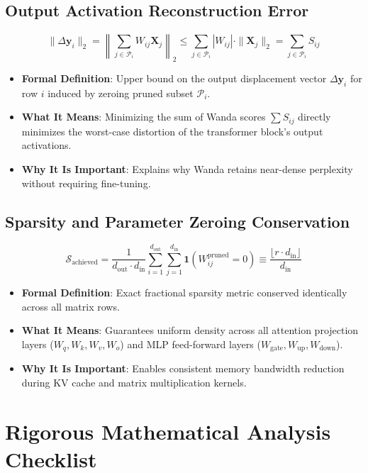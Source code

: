 \documentclass[11pt,a4paper]{article}
\theoremstyle{definition}
\begin{document}
\subsection{Output Activation Reconstruction Error}
{\boldmath
\begin{equation}
\|\Delta \mathbf{y}_i\|_2 = \left\| \sum_{j \in \mathcal{P}_i} W_{ij} \mathbf{X}_j \right\|_2 \le \sum_{j \in \mathcal{P}_i} |W_{ij}| \cdot \|\mathbf{X}_j\|_2 = \sum_{j \in \mathcal{P}_i} S_{ij}
\end{equation}
}
\begin{itemize}
    \item \textbf{Formal Definition}: Upper bound on the output displacement vector $\Delta \mathbf{y}_i$ for row $i$ induced by zeroing pruned subset $\mathcal{P}_i$.
    \item \textbf{What It Means}: Minimizing the sum of Wanda scores $\sum S_{ij}$ directly minimizes the worst-case distortion of the transformer block's output activations.
    \item \textbf{Why It Is Important}: Explains why Wanda retains near-dense perplexity without requiring fine-tuning.
\end{itemize}

\subsection{Sparsity and Parameter Zeroing Conservation}
{\boldmath
\begin{equation}
\mathcal{S}_{\text{achieved}} = \frac{1}{d_{\text{out}} \cdot d_{\text{in}}} \sum_{i=1}^{d_{\text{out}}} \sum_{j=1}^{d_{\text{in}}} \mathbf{1}\left( W_{ij}^{\text{pruned}} = 0 \right) \equiv \frac{\lfloor r \cdot d_{\text{in}} \rfloor}{d_{\text{in}}}
\end{equation}
}
\begin{itemize}
    \item \textbf{Formal Definition}: Exact fractional sparsity metric conserved identically across all matrix rows.
    \item \textbf{What It Means}: Guarantees uniform density across all attention projection layers ($W_q, W_k, W_v, W_o$) and MLP feed-forward layers ($W_{\text{gate}}, W_{\text{up}}, W_{\text{down}}$).
    \item \textbf{Why It Is Important}: Enables consistent memory bandwidth reduction during KV cache and matrix multiplication kernels.
\end{itemize}

\section{Rigorous Mathematical Analysis Checklist}
\end{document}
